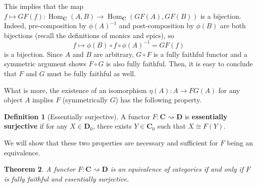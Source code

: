 \documentclass{article}
\newtheorem{thm}{Theorem}
\theoremstyle{definition}
\newtheorem{defn}[thm]{Definition}
\theoremstyle{remark}
\DeclareMathOperator{\Hom}{Hom}
\begin{document}
This implies that the map $f \mapsto GF(f):\Hom_{\mathbf{C}}(A,B) \rightarrow \Hom_{\mathbf{C}}(GF(A), GF(B))$ is a bijection. Indeed, pre-composition by $\phi(A)^{-1}$ and post-composition by $\phi(B)$ are both bijections (recall the definitions of monics and epics), so \[f \mapsto \phi(B) \circ f \circ \phi(A)^{-1} = GF(f)\]is a bijection. Since $A$ and $B$ are arbitrary, $G\circ F$ is a fully faithful functor and a symmetric argument shows $F\circ G$ is also fully faithful. Then, it is easy to conclude that $F$ and $G$ must be fully faithful as well.

What is more, the existence of an isomorphism $\eta(A): A \rightarrow FG(A)$ for any object $A$ implies $F$ (symmetrically $G$) has the following property.
\begin{defn}[Essentially surjective]
	A functor $F:\mathbf{C}\rightsquigarrow \mathbf{D}$ is \textbf{essentially surjective} if for any $X \in \mathbf{D}_0$, there exists $Y \in \mathbf{C}_0$ such that $X \cong F(Y)$.
\end{defn}
We will show that these two properties are necessary and sufficient for $F$ being an equivalence.
\begin{thm}
	A functor $F:\mathbf{C}\rightsquigarrow \mathbf{D}$ is an equivalence of categories if and only if $F$ is fully faithful and essentially surjective.
\end{thm}
\end{document}
